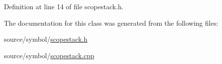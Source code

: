 Definition at line 14 of file scopestack.\-h.



The documentation for this class was generated from the following files\-:\begin{DoxyCompactItemize}
\item 
source/symbol/\hyperlink{scopestack_8h}{scopestack.\-h}\item 
source/symbol/\hyperlink{scopestack_8cpp}{scopestack.\-cpp}\end{DoxyCompactItemize}
